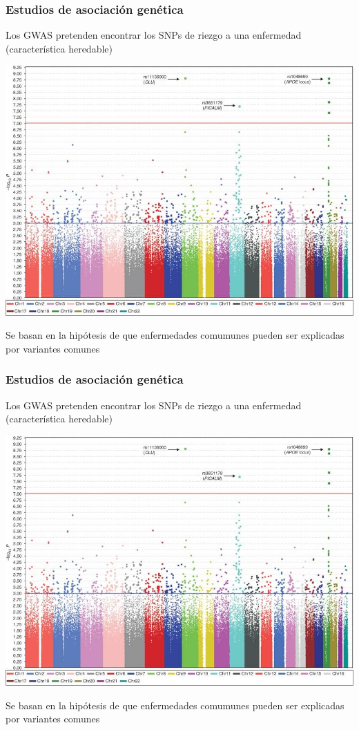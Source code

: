 \documentclass{beamer}\usepackage[]{graphicx}\usepackage[]{color}
\begin{document}
\begin{frame}[fragile]
\frametitle{Estudios de asociaci\'on gen\'etica}

Los GWAS pretenden encontrar los SNPs de riezgo a una enfermedad (caracter\'istica heredable)

\begin{center}
\includegraphics[width=0.7\linewidth]{alz.jpg}
\end{center}

Se basan en la hip\'otesis de que enfermedades comumunes pueden ser explicadas por variantes comunes
\end{frame}


\begin{frame}[fragile]
\frametitle{Estudios de asociaci\'on gen\'etica}

Los GWAS pretenden encontrar los SNPs de riezgo a una enfermedad (caracter\'istica heredable)

\begin{center}
\includegraphics[width=0.7\linewidth]{alz.jpg}
\end{center}

Se basan en la hip\'otesis de que enfermedades comumunes pueden ser explicadas por variantes comunes
\end{frame}
\end{document}
